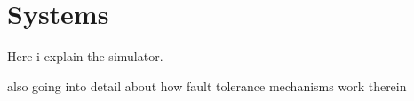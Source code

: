 \chapter{Systems}
\label{chapSystems}
Here i explain the simulator.

also going into detail about how fault tolerance mechanisms work therein